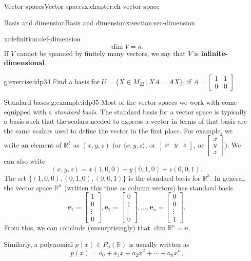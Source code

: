 \documentclass[oneside,10pt,]{book}
\newcommand{\terminology}[1]{\textbf{#1}}
\numberwithin{equation}{section}
\newcommand{\bbm}{\begin{bmatrix}}
\newcommand{\ebm}{\end{bmatrix}}
\newcommand{\R}{\mathbb{R}}
\newcommand{\vece}{\mathbf{e}}
\newcommand{\amp}{&}
\begin{document}
\begin{chapterptx}{Vector spaces}{}{Vector spaces}{}{}{x:chapter:ch-vector-space}
\begin{sectionptx}{Basis and dimension}{}{Basis and dimension}{}{}{x:section:sec-dimension}
\begin{definition}{}{x:definition:def-dimension}
\begin{equation*}
\dim V = n\text{.}
\end{equation*}
If \(V\) cannot be spanned by finitely many vectors, we say that \(V\) is \terminology{infinite-dimensional}.%
\end{definition}
\begin{inlineexercise}{}{g:exercise:idp34}%
Find a basis for \(U=\{X\in M_{22} \,|\, XA = AX\}\), if \(A = \bbm 1\amp 1\\0\amp 0\ebm\)%
\end{inlineexercise}%
\begin{example}{Standard bases.}{g:example:idp35}%
Most of the vector spaces we work with come equipped with a \emph{standard basis}. The standard basis for a vector space is typically a basis such that the scalars needed to express a vector in terms of that basis are the same scalars used to define the vector in the first place. For example, we write an element of \(\R^3\) as \((x,y,z)\) (or \(\langle x,y,z\rangle\), or \(\begin{bmatrix}x\amp y\amp z\end{bmatrix}\), or \(\begin{bmatrix}x\\y\\z\end{bmatrix}\)\textellipsis{}). We can also write%
\begin{equation*}
(x,y,z)=x(1,0,0)+y(0,1,0)+z(0,0,1)\text{.}
\end{equation*}
The set \(\{(1,0,0),(0,1,0),(0,0,1)\}\) is the standard basis for \(\R^3\). In general, the vector space \(\R^n\) (written this time as column vectors) has standard basis%
\begin{equation*}
\vece_1=\bbm 1\\0\\ \vdots \\0\ebm, \vece_2 = \bbm 0\\1\\ \vdots \\0\ebm, \ldots, \vece_n=\bbm 0\\0\\ \vdots \\1\ebm\text{.}
\end{equation*}
From this, we can conclude (unsurprisingly) that \(\dim \R^n = n\).%
\par
Similarly, a polynomial \(p(x)\in P_n(\R)\) is usually written as%
\begin{equation*}
p(x) = a_0+a_1x+a_2x^2+\cdots + a_nx^n\text{,}

\end{equation*}
\end{example}
\end{sectionptx}
\end{chapterptx}
\end{document}

